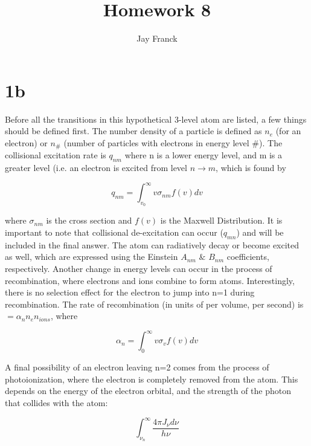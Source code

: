 \documentclass{article}
\begin{document}
\title{Homework 8}
\author{Jay Franck}
\maketitle



\section*{1b}

Before all the transitions in this hypothetical 3-level atom are listed, a few things should be defined first. The number density of a particle is defined as $n_e$ (for an electron) or $n_\#$ (number of particles with electrons in energy level $\#$). The collisional excitation rate is $q_{nm}$ where n is a lower energy level, and m is a greater level (i.e. an electron is excited from level $n \rightarrow m$, which is found by

\begin{equation}
q_{nm} = \int_{v_0}^\infty v \sigma_{nm} f(v) dv
\end{equation}

where $\sigma_{nm}$ is the cross section and $f(v)$ is the Maxwell Distribution. It is important to note that collisional de-excitation can occur ($q_{mn}$) and will be included in the final answer. The atom can radiatively decay or become excited as well, which are expressed using the Einstein $A_{nm}$ $\&$ $B_{nm} $ coefficients, respectively. Another change in energy levels can occur in the process of recombination, where electrons and ions combine to form atoms. Interestingly, there is no selection effect for the electron to jump into n=1 during recombination. The rate of recombination (in units of per volume, per second) is $ = \alpha_n n_e n_{ions} $, where 

\begin{equation}
\alpha_n = \int_{0}^\infty v \sigma_{v} f(v) dv
\end{equation}

A final possibility of an electron leaving n=2 comes from the process of photoionization, where the electron is completely removed from the atom. This depends on the energy of the electron orbital, and the strength of the photon that collides with the atom:

\begin{equation}
 \int_{\nu_n}^\infty \frac{4 \pi J_{\nu} d\nu}{h \nu}
\end{equation}
\end{document}
